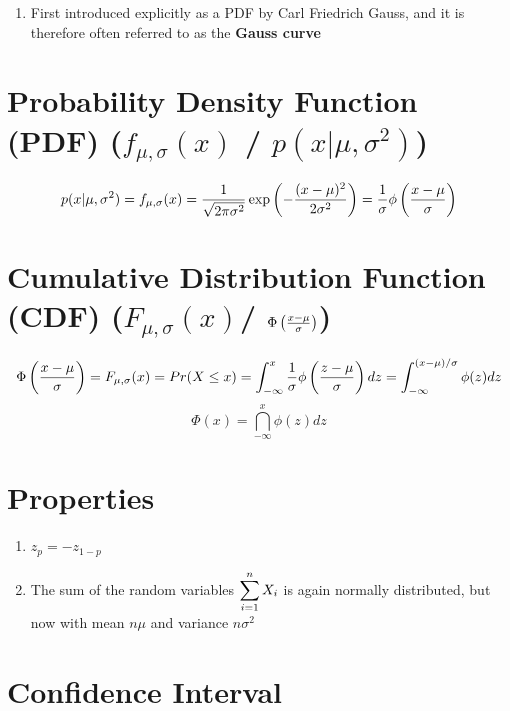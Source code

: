 \begin{enumerate}
    \item First introduced explicitly as a PDF by Carl Friedrich Gauss, and it is therefore often referred to as the \textbf{Gauss curve} 
\end{enumerate}

\section{Probability Density Function (PDF) ($f_{\mu,\sigma}(x)$ / $p(x|\mu,\sigma^2)$) \cite{ism-1,mfml-1}} \label{Normal Distribution: PDF}

\[
    p(x|\mu,\sigma^2)
    = f_{\mu,\sigma}(x)
    = \dfrac{1}{\sqrt{2\pi\sigma^2}}
    \exp\left(
        -\dfrac{(x - \mu)^2}{2\sigma^2}
    \right)
    = \dfrac{1}{\sigma}\phi\left(
        \dfrac{x - \mu}{\sigma}
    \right)
\]


\section{Cumulative Distribution Function (CDF) ($F_{\mu,\sigma}(x)$/ $\Phi\left( \frac{x-\mu}{\sigma} \right)$) \cite{ism-1}} \label{Normal Distribution: CDF}

\[
    \Phi\left(\dfrac{x-\mu}{\sigma}\right)
    = F_{\mu,\sigma}(x)
    = Pr(X \leq x)
    = \displaystyle\int_{-\infty}^x \dfrac{1}{\sigma}\phi\left(
        \dfrac{z - \mu}{\sigma}
    \right) dz
    = \displaystyle\int_{-\infty}^{(x - \mu)/\sigma} \phi(z) dz
\]
\[
    \Phi(x) = \dint_{-\infty}^{x} \phi(z) dz
\]


\section{Properties \cite{ism-1}}

\begin{enumerate}
    \item $z_p = -z_{1-p}$

    \item The sum of the random variables $\displaystyle\sum_{i=1}^{n} X_i$ is again normally distributed, but now with mean $n\mu$ and variance $n\sigma^2$
\end{enumerate}

\section{Confidence Interval \cite{ism-1}}


